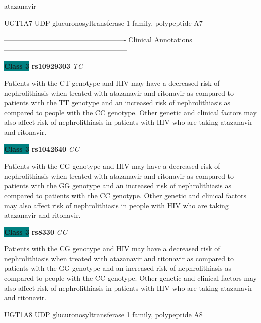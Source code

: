 \documentclass{resume} %
\begin{document}
\begin{rSection}{ atazanavir }
\begin{rSubsection}{ UGT1A7 }{ UDP glucuronosyltransferase 1 family, polypeptide A7 }{}{}
\item[] ---------------------------------------------------- Clinical Annotations -----------------------------------------------------\newline
\item \textbf{\colorbox{teal} {Class 3}} \textbf{ rs10929303 } \textit{ TC }
\item[] Patients with the CT genotype and HIV may have a decreased risk of nephrolithiasis when treated with atazanavir and ritonavir as compared to patients with the TT genotype and an increased risk of nephrolithiasis as compared to people with the CC genotype. Other genetic and clinical factors may also affect risk of nephrolithiasis in patients with HIV who are taking atazanavir and ritonavir. \item \textbf{\colorbox{teal} {Class 3}} \textbf{ rs1042640 } \textit{ GC }
\item[] Patients with the CG genotype and HIV may have a decreased risk of nephrolithiasis when treated with atazanavir and ritonavir as compared to patients with the GG genotype and an increased risk of nephrolithiasis as compared to patients with the CC genotype. Other genetic and clinical factors may also affect risk of nephrolithiasis in people with HIV who are taking atazanavir and ritonavir.\item \textbf{\colorbox{teal} {Class 3}} \textbf{ rs8330 } \textit{ GC }
\item[] Patients with the CG genotype and HIV may have a decreased risk of nephrolithiasis when treated with atazanavir and ritonavir as compared to patients with the GG genotype and an increased risk of nephrolithiasis as compared to people with the CC genotype. Other genetic and clinical factors may also affect risk of nephrolithiasis in patients with HIV who are taking atazanavir and ritonavir.
\end{rSubsection}\begin{rSubsection}{ UGT1A8 }{ UDP glucuronosyltransferase 1 family, polypeptide A8 }{}{}
\item[]


\end{rSubsection}
\end{rSection}
\end{document}
